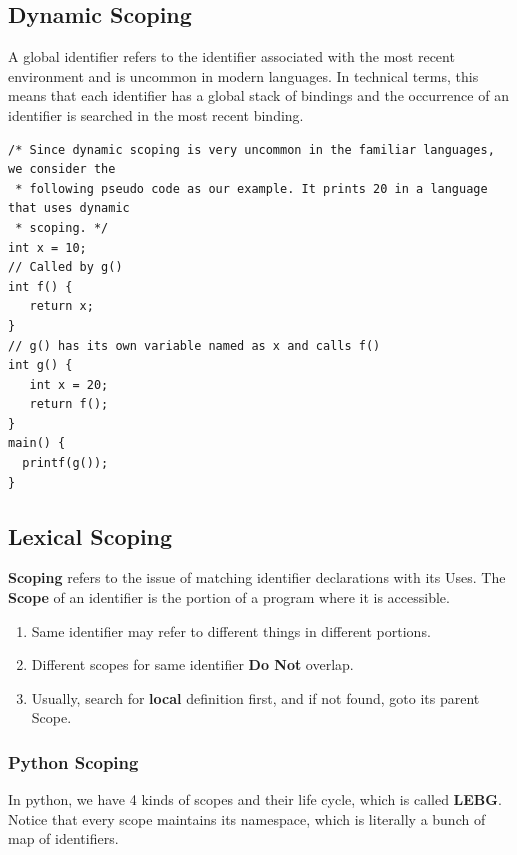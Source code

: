 \documentclass[a4paper]{exam}
\begin{document}
\subsection{Dynamic Scoping}
A global identifier refers to the identifier associated with the most recent environment and is uncommon in modern languages. In technical terms, this means that each identifier has a global stack of bindings and the occurrence of an identifier is searched in the most recent binding.

\begin{verbatim}
/* Since dynamic scoping is very uncommon in the familiar languages, we consider the 
 * following pseudo code as our example. It prints 20 in a language that uses dynamic
 * scoping. */ 
int x = 10;
// Called by g()
int f() {
   return x;
} 
// g() has its own variable named as x and calls f()
int g() {
   int x = 20;
   return f();
}
main() {
  printf(g());
}
\end{verbatim}
\subsection{Lexical Scoping}

\textbf{Scoping} refers to the issue of matching identifier declarations \cite{identifier} with its Uses. The \textbf{Scope} of an identifier is the portion of a program where it is accessible.
\begin{enumerate}
  \item Same identifier may refer to different things in different portions.
  \item Different scopes for same identifier \textbf{Do Not} overlap.
  \item Usually, search for \textbf{local} definition first, and if not found, goto its parent Scope.
\end{enumerate}

\subsubsection{Python Scoping}

In python, we have 4 kinds of scopes and their life cycle, which is called \textbf{LEBG}. Notice that every scope maintains its namespace, which is literally a bunch of map of identifiers.
\end{document}
